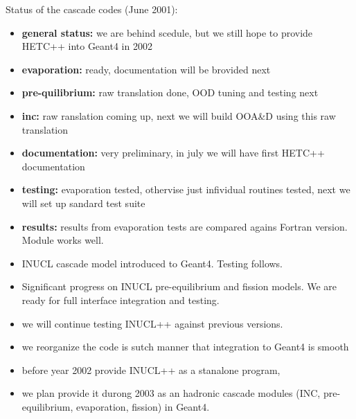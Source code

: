 Status of the cascade codes (June 2001):
\begin{itemize}
\item {\bf general status:} we are behind scedule, but we
still hope to provide HETC++ into Geant4 in 2002
\item {\bf evaporation:} ready, documentation will be brovided next
\item {\bf pre-quilibrium:} raw translation done, OOD tuning and testing next
\item {\bf inc:} raw ranslation coming up, next we will build OOA\&D
using this raw translation
\item {\bf documentation:} very preliminary, in july we will have
first HETC++ documentation
\item {\bf testing:} evaporation tested, othervise just infividual
routines tested, next we will set up sandard test suite
\item {\bf results:} results from evaporation tests are compared agains
Fortran version. Module works well. 
\item INUCL cascade model introduced to Geant4. Testing follows.
\item Significant progress on INUCL pre-equilibrium and fission models. We are ready for full interface integration and testing.
\item we will continue testing INUCL++ against previous versions.
\item we reorganize the code is sutch manner that integration to Geant4
  is smooth
\item before year 2002 provide INUCL++ as a stanalone program, 
\item we plan provide it durong 2003 as an hadronic cascade modules  (INC, pre-equilibrium, evaporation, fission) in Geant4. 
\end{itemize}


